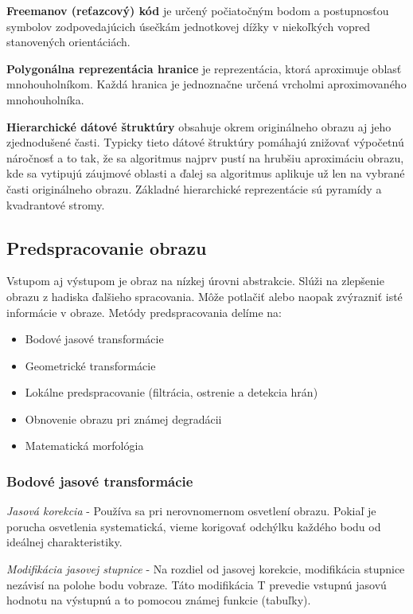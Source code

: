 \begin{itemize}
\textbf{Freemanov (reťazcový) kód}  je určený počiatočným bodom a postupnosťou symbolov zodpovedajúcich úsečkám jednotkovej dížky v niekoľkých vopred stanovených orientáciách. 

\textbf{Polygonálna reprezentácia hranice} je reprezentácia, ktorá aproximuje oblasť mnohouholníkom. Každá hranica je jednoznačne určená vrcholmi aproximovaného mnohouholníka.

\textbf{Hierarchické dátové štruktúry} obsahuje okrem originálneho obrazu aj jeho zjednodušené časti. Typicky tieto dátové štruktúry pomáhajú znižovať výpočetnú náročnosť a to tak, že sa algoritmus najprv pustí na hrubšiu aproximáciu obrazu, kde sa vytipujú záujmové oblasti a ďalej sa algoritmus aplikuje už len na vybrané časti originálneho obrazu. Základné hierarchické reprezentácie sú pyramídy a kvadrantové stromy. 

\end{itemize}



\subsection{Predspracovanie obrazu}
Vstupom aj výstupom je obraz na nízkej úrovni abstrakcie. Slúži na zlepšenie obrazu z hadiska ďalšieho spracovania. Môže potlačiť alebo naopak zvýrazniť isté informácie v obraze. Metódy predspracovania delíme na: 
\begin{itemize}
\item Bodové jasové transformácie
\item Geometrické transformácie
\item Lokálne predspracovanie (filtrácia, ostrenie a detekcia hrán)
\item Obnovenie obrazu pri známej degradácii 
\item Matematická morfológia 
\end{itemize}

\subsubsection{Bodové jasové transformácie}

\textit{Jasová korekcia} - Používa sa pri nerovnomernom osvetlení obrazu. Pokiaľ je porucha
osvetlenia systematická, vieme korigovať odchýlku každého bodu od ideálnej charakteristiky.

\textit{Modifikácia jasovej stupnice} - Na rozdiel od jasovej korekcie, modifikácia stupnice nezávisí na polohe bodu vobraze. Táto modifikácia T prevedie vstupnú jasovú hodnotu na výstupnú a to pomocou známej funkcie (tabuľky). 


